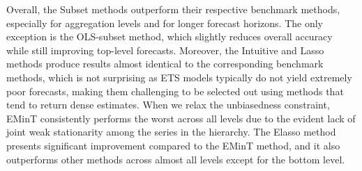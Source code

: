 \documentclass[11pt,a4paper,]{article}
\begin{document}
Overall, the Subset methods outperform their respective benchmark
methods, especially for aggregation levels and for longer forecast
horizons. The only exception is the OLS-subset method, which slightly
reduces overall accuracy while still improving top-level forecasts.
Moreover, the Intuitive and Lasso methods produce results almost
identical to the corresponding benchmark methods, which is not
surprising as ETS models typically do not yield extremely poor
forecasts, making them challenging to be selected out using methods that
tend to return dense estimates. When we relax the unbiasedness
constraint, EMinT consistently performs the worst across all levels due
to the evident lack of joint weak stationarity among the series in the
hierarchy. The Elasso method presents significant improvement compared
to the EMinT method, and it also outperforms other methods across almost
all levels except for the bottom level.
\end{document}
